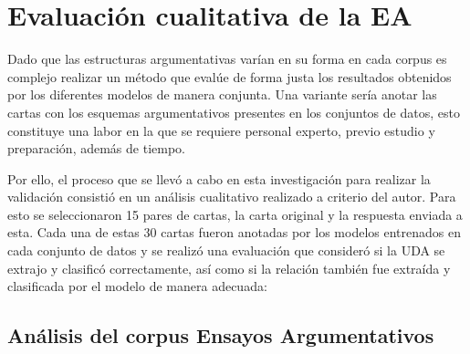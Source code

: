\documentclass[a4paper,11pt,twocolumn,twoside]{article}
\begin{document}
\section{Evaluación cualitativa de la EA}

Dado que las estructuras argumentativas varían en su forma en cada corpus es complejo realizar un método que evalúe de forma 
justa los resultados obtenidos por los diferentes modelos de manera conjunta. Una variante sería anotar las cartas 
con los esquemas argumentativos presentes en los conjuntos de datos, esto constituye una labor en la que se requiere
personal experto, previo estudio y preparación, además de tiempo. 

Por ello, el proceso que se llevó a cabo en esta investigación para realizar la 
validación consistió en un análisis cualitativo realizado a criterio del autor. Para esto se seleccionaron 15 pares 
de cartas, la carta original y la respuesta enviada a esta. Cada una de estas 30 cartas fueron anotadas por los modelos entrenados en cada 
conjunto de datos y se realizó una evaluación que consideró si la UDA se extrajo y clasificó correctamente, 
así como si la relación también fue extraída y clasificada por el modelo de manera adecuada:


\subsection{Análisis del corpus Ensayos Argumentativos}

\end{document}
